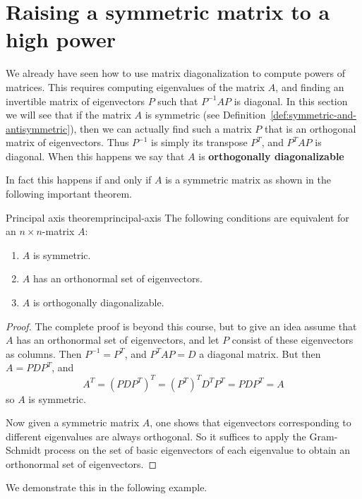 \section{Raising a symmetric matrix to a high power}

We already have seen how to use matrix diagonalization to compute
powers of matrices. This requires computing eigenvalues of the matrix
$A$, and finding an invertible matrix of eigenvectors $P$ such that
$P^{-1}AP$ is diagonal. In this section we will see that if the matrix
$A$ is symmetric (see Definition~\ref{def:symmetric-and-antisymmetric}),
then we can actually find such a matrix $P$ that is an orthogonal
matrix of eigenvectors. Thus $P^{-1}$ is simply its transpose
$P^T$, and $P^TAP$ is diagonal. When this happens we say that $A$ is
\textbf{orthogonally diagonalizable}

In fact this happens if and only if $A$ is a symmetric matrix as
shown in the following important theorem.

\begin{theorem}{Principal axis theorem}{principal-axis}
The following conditions are equivalent for an $n \times n$-matrix $A$:
\begin{enumerate}
\item $A$ is symmetric. 
\item $A$ has an orthonormal set of eigenvectors. 
\item $A$ is  orthogonally diagonalizable.
\end{enumerate}
\end{theorem}

\begin{proof}
The complete proof is beyond this course, but to give an idea assume
that $A$ has an orthonormal set of eigenvectors, and let $P$ consist
of these eigenvectors as columns. Then $P^{-1}=P^T$, and $P^TAP=D$ a diagonal matrix. But then $A=PDP^T$, and
\[ A^T=(PDP^T)^T = (P^T)^TD^TP^T=PDP^T=A\]
so $A$ is symmetric. 

Now given a symmetric matrix $A$, one shows that eigenvectors
corresponding to different eigenvalues are always orthogonal. So it
suffices to apply the Gram-Schmidt process on the set of basic
eigenvectors of each eigenvalue to obtain an orthonormal set of eigenvectors. 
\end{proof}

We demonstrate this in the following example. 

